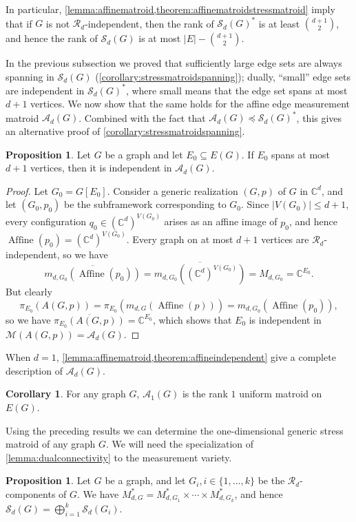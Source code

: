\documentclass[11pt,a4paper,dvipsnames]{scrartcl}
\theoremstyle{definition}
\newtheorem{corollary}[theorem]{Corollary}
\newtheorem{proposition}[theorem]{Proposition}
\newcommand{\CC}{\mathbb{C}}
\newcommand{\algmat}[1]{\mathcal{M}(#1)}
\newcommand{\stressmatroid}[2]{\mathcal{S}_{#1}(#2)}
\newcommand{\affinematroid}[2]{\mathcal{A}_{#1}(#2)}
\newcommand{\affineedge}[2]{A(#1,#2)}
\DeclareMathOperator{\aff}{Affine}
\newcommand{\affine}[2]{\aff(#2)}
\begin{document}
In particular, \cref{lemma:affinematroid,theorem:affinematroidstressmatroid} imply that if $G$ is not $\mathcal{R}_d$-independent, then the rank of $\stressmatroid{d}{G}^*$ is at least $\binom{d+1}{2}$, and hence the rank of $\stressmatroid{d}{G}$ is at most $|E| - \binom{d+1}{2}$. 

In the previous subsection we proved that sufficiently large edge sets are always spanning in $\stressmatroid{d}{G}$ (\cref{corollary:stressmatroidspanning}); dually, ``small'' edge sets are independent in $\stressmatroid{d}{G}^*$, where small means that the edge set spans at most $d+1$ vertices. We now show that the same holds for the affine edge measurement matroid $\affinematroid{d}{G}$. Combined with the fact that $\affinematroid{d}{G} \preceq \stressmatroid{d}{G}^*$, this gives an alternative proof of \cref{corollary:stressmatroidspanning}.

\begin{proposition}\label{theorem:affineindependent}
    Let $G$ be a graph and let $E_0 \subseteq E(G)$. If $E_0$ spans at most $d+1$ vertices, then it is independent in $\affinematroid{d}{G}$.
\end{proposition}
\begin{proof}
    Let $G_0 = G[E_0]$. Consider a generic realization $(G,p)$ of $G$ in $\CC^d$, and let $(G_0,p_0)$ be the subframework corresponding to $G_0$. Since $|V(G_0)| \leq d+1$, every configuration $q_0 \in (\CC^d)^{V(G_0)}$ arises as an affine image of $p_0$, and hence $\affine{G_0}{p_0} = (\CC^d)^{V(G_0)}$. Every graph on at most $d+1$ vertices are $\mathcal{R}_d$-independent, so we have \[\overline{m_{d,G_0}(\affine{G_0}{p_0})} = \overline{m_{d,G_0}({(\CC^{d})}^{V(G_0)})} = M_{d,G_0} = \CC^{E_0}.\] But clearly \[\pi_{E_0}(\affineedge{G}{p}) = \pi_{E_0}(m_{d,G}(\affine{G}{p})) = m_{d,G_0}(\affine{G_0}{p_0}),\] so we have $\overline{\pi_{E_0}(\affineedge{G}{p})} = \CC^{E_0}$, which shows that $E_0$ is independent in $\algmat{\affineedge{G}{p}} = \affinematroid{d}{G}$.
\end{proof}

When $d=1$, \cref{lemma:affinematroid,theorem:affineindependent} give a complete description of $\affinematroid{d}{G}$.

\begin{corollary}\label{lemma:1dimaffinematroid}
    For any graph $G$, $\affinematroid{1}{G}$ is the rank $1$ uniform matroid on $E(G)$. 
\end{corollary}

Using the preceding results we can determine the one-dimensional generic stress matroid of any graph $G$. We will need the specialization of \cref{lemma:dualconnectivity} to the measurement variety.
\begin{proposition}\label{lemma:stressmatroidconnectivity}
    Let $G$ be a graph, and let $G_i, i \in \{1,\ldots,k\}$ be the $\mathcal{R}_d$-components of $G$. We have $M_{d,G}^* = M_{d,G_1}^* \times \cdots \times M_{d,G_k}^*$, and hence $\stressmatroid{d}{G} = \bigoplus_{i=1}^{k} \stressmatroid{d}{G_i}$.
\end{proposition}
\end{document}
